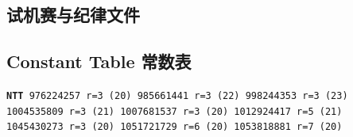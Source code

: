 \documentclass[titlepage, a4paper, 11pt]{article}
\begin{document}
\begin{spacing}{1.15}
				\subsection{试机赛与纪律文件}
				\begin{spacing}{0.3}
					
				\end{spacing}
				\subsection{Constant Table 常数表}
				\label{randomprimes}
				\begin{small}
					\setlength{\parindent}{0em}\setlength{\parskip}{0em}\renewcommand{\baselinestretch}{.8}
					\texttt{\textbf{NTT} 976224257 r=3 (20)
					985661441 r=3 (22)
					998244353 r=3 (23)\\
					1004535809 r=3 (21)
					1007681537 r=3 (20)
					1012924417 r=5 (21)\\
					1045430273 r=3 (20)
					1051721729 r=6 (20)
					1053818881 r=7 (20)				
					}
				\end{small}
				

\end{spacing}
\end{document}
